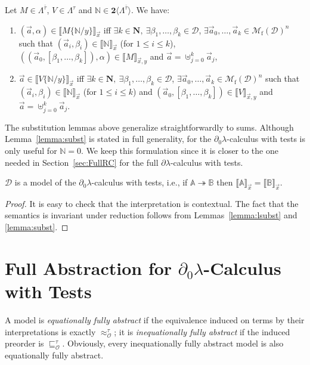 \documentclass{LMCS}
\newcommand{\nat}{\mathbf{N}}
\newcommand{\bool}{\mathbf{2}}
\newcommand{\dlam}{\ensuremath{\partial\lambda}}
\newcommand{\dzlam}{\ensuremath{\partial_0\lambda}}
\newcommand{\Set}[1]{\Lambda^{#1}}
\newcommand{\sums}[1]{\bool\langle\Set{#1}\rangle}
\newcommand{\msto}{\twoheadrightarrow}
\newcommand{\subst}[2]{\{ #2 / #1 \}}	\newcommand{\dg}[2]{\mathrm{deg}_{#1}(#2)} \newcommand{\obsle}{\sqsubseteq_{\mathcal{O}}}
\newcommand{\Tobsle}{\sqsubseteq^{\gt}_{\mathcal{O}}}
\newcommand{\Tobseq}{\approx^{\gt}_{\mathcal{O}}}
\newcommand{\Int}[1]{\llbracket #1\rrbracket} \newcommand{\trm}[1]{#1^{\textrm{--}}}
\newcommand{\Mfin}[1]{\mathcal{M}_{\mathrm{f}}(#1)}
\newcommand{\mcup}{\uplus}
\newcommand{\seq}[1]{\vec{#1}}
\newcommand{\sA}{\mathbb{A}}
\newcommand{\sB}{\mathbb{B}}
\newcommand{\sN}{\mathbb{N}}
\newcommand{\gt}{\ensuremath{\tau}}
\newcommand{\gto}{\ensuremath{\bar\tau}}
\newcommand{\cD}{\mathcal{D}}
\begin{document}
\begin{lem}\label{lemma:subst}
Let $M\in\Set{\gto}$, $V\in\Set{\gt}$ and $\sN\in\sums{\gto}$. 
We have:
\begin{enumerate}[\em(i)]
\item $(\seq a, \alpha)\in \Int{M\subst{y}{\sN}}_{\seq x}$ iff 
	$\exists k\in\nat,\ \exists\beta_1,\ldots,\beta_k\in \cD$, 
	$\exists\seq a_0,\ldots,\seq a_{k}\in\Mfin{\cD}^n$ such that
	$(\seq a_i,\beta_i)\in\Int{\sN}_{\seq x}$ (for $1\le i \le k$),
	$((\seq a_0,[\beta_1,\ldots,\beta_k]), \alpha)\in\Int{M}_{\seq x,y}$ and 
	$\seq a = \mcup_{j=0}^{k} \seq a_j$,
\item $\seq a\in \Int{V\subst{y}{\sN}}_{\seq x}$ iff 
	$\exists k\in\nat,\ \exists\beta_1,\ldots,\beta_k\in \cD$, 
	$\exists\seq a_0,\ldots,\seq a_{k}\in\Mfin{\cD}^n$ such that
	$(\seq a_i,\beta_i)\in\Int{\sN}_{\seq x}$ (for $1\le i \le k$) and
	$(\seq a_0,[\beta_1,\ldots,\beta_k])\in\Int{V}_{\seq x,y}$ and 
	$\seq a = \mcup_{j=0}^{k} \seq a_j$.
\end{enumerate}
\end{lem}\medskip

\noindent The substitution lemmas above generalize straightforwardly to sums.
Although Lem\-ma~\ref{lemma:subst} is stated in full generality, 
for the \dzlam-calculus with tests is only useful for $\sN = 0$.
We keep this formulation since it is closer to the one needed in Section~\ref{sec:FullRC}
for the full \dlam-calculus with tests.

\begin{thm}\label{thm:Dmodel}
$\cD$ is a model of the \dzlam-calculus with tests, i.e., if ${\sA}\msto{\sB}$ then $\Int\sA_{\seq x}=\Int\sB_{\seq x}$.
\end{thm}

\begin{proof} It is easy to check that the interpretation is contextual. 
The fact that the semantics is invariant under reduction follows from 
Lemmas~\ref{lemma:lsubst} and \ref{lemma:subst}.
\end{proof}

\section{Full Abstraction for $\dzlam$-Calculus with Tests}\label{sec:FA-dzlam-with-Tests}

A model is \emph{equationally fully abstract} if the equivalence 
induced on terms by their interpretations is exactly $\Tobseq$; 
it is \emph{inequationally fully abstract} if the induced preorder is $\Tobsle$.
Obviously, every inequationally fully abstract model is also equationally fully abstract.
\end{document}
